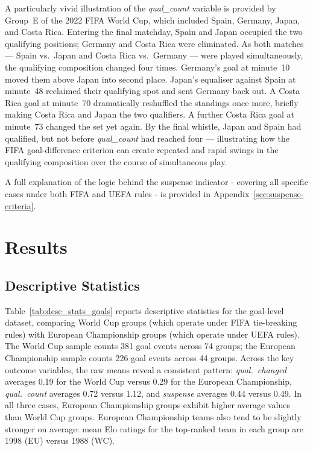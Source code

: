 \documentclass[11pt]{article}
\begin{document}
A particularly vivid illustration of the \textit{qual\_count} variable is provided by Group~E of the 2022 FIFA World Cup, which included Spain, Germany, Japan, and Costa Rica. Entering the final matchday, Spain and Japan occupied the two qualifying positions; Germany and Costa Rica were eliminated. As both matches — Spain vs.\ Japan and Costa Rica vs.\ Germany — were played simultaneously, the qualifying composition changed four times. Germany's goal at minute~10 moved them above Japan into second place. Japan's equaliser against Spain at minute~48 reclaimed their qualifying spot and sent Germany back out. A Costa Rica goal at minute~70 dramatically reshuffled the standings once more, briefly making Costa Rica and Japan the two qualifiers. A further Costa Rica goal at minute~73 changed the set yet again. By the final whistle, Japan and Spain had qualified, but not before \textit{qual\_count} had reached four — illustrating how the FIFA goal-difference criterion can create repeated and rapid swings in the qualifying composition over the course of simultaneous play.

A full explanation of the logic behind the suspense indicator - covering all specific cases under both FIFA and UEFA rules - is provided in Appendix~\ref{sec:suspense-criteria}.


\section{Results}
\label{sec:results}

\subsection{Descriptive Statistics}


Table~\ref{tab:desc_stats_goals} reports descriptive statistics for the goal-level dataset, comparing World Cup groups (which operate under FIFA tie-breaking rules) with European Championship groups (which operate under UEFA rules). The World Cup sample counts 381 goal events across 74 groups; the European Championship sample counts 226 goal events across 44 groups. Across the key outcome variables, the raw means reveal a consistent pattern: \textit{qual.\ changed} averages 0.19 for the World Cup versus 0.29 for the European Championship, \textit{qual.\ count} averages 0.72 versus 1.12, and \textit{suspense} averages 0.44 versus 0.49. In all three cases, European Championship groups exhibit higher average values than World Cup groups. European Championship teams also tend to be slightly stronger on average: mean Elo ratings for the top-ranked team in each group are 1998 (EU) versus 1988 (WC).
\end{document}
